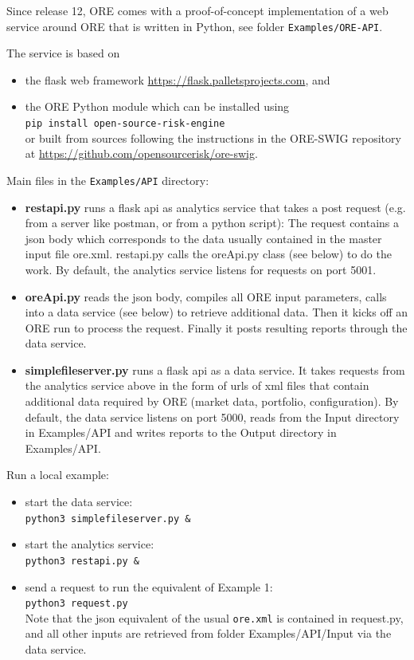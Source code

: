Since release 12, ORE comes with a proof-of-concept implementation of a web service around ORE
that is written in Python, see folder {\tt Examples/ORE-API}.

The service is based on
\begin{itemize}
\item the flask web framework \url{https://flask.palletsprojects.com}, and
\item the ORE Python module which can be installed using \\
  {\tt pip install open-source-risk-engine} \\
  or built from sources following the instructions in the ORE-SWIG repository
  at \url{https://github.com/opensourcerisk/ore-swig}.
\end{itemize}

\medskip
Main files in the {\tt Examples/API} directory:
\begin{itemize}
\item {\bf restapi.py} runs a flask api as analytics service that takes a post request
  (e.g. from a server like postman, or from a python script): The request contains a json body
  which corresponds to the data usually contained in the master input file ore.xml. restapi.py
  calls the oreApi.py class (see below) to do the work. By default, the analytics service listens for
  requests on port 5001.
\item {\bf oreApi.py} reads the json body, compiles all ORE input parameters, calls into a
  data service (see below) to retrieve additional data. Then it kicks off an ORE run to process
  the request.  Finally it posts resulting reports through the data service.
\item {\bf simplefileserver.py} runs a flask api as a data service. It takes requests from the
  analytics service above in the form of urls of xml files that contain additional data required
  by ORE (market data, portfolio, configuration). By default, the data service
  listens on port 5000, reads from the Input directory in Examples/API and writes reports to the Output
  directory in Examples/API.
\end{itemize}

\medskip
Run a local example:
\begin{itemize}
\item start the data service: \\
  {\tt python3 simplefileserver.py \&} 
\item start the analytics service: \\
  {\tt python3 restapi.py \&}
\item send a request to run the equivalent of Example 1: \\
  {\tt python3 request.py} \\
  Note that the json equivalent of the usual {\tt ore.xml} is contained in request.py,
  and all other inputs are retrieved from folder Examples/API/Input via the data service.
\end{itemize}

